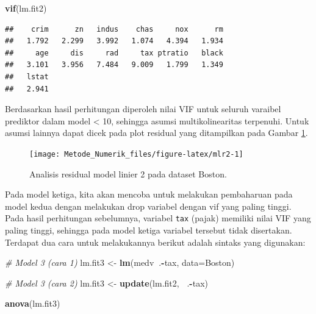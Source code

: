 \documentclass[]{book}
\newenvironment{Shaded}{\begin{snugshade}}{\end{snugshade}}
\newcommand{\CommentTok}[1]{\textcolor[rgb]{0.56,0.35,0.01}{\textit{#1}}}
\newcommand{\DataTypeTok}[1]{\textcolor[rgb]{0.13,0.29,0.53}{#1}}
\newcommand{\KeywordTok}[1]{\textcolor[rgb]{0.13,0.29,0.53}{\textbf{#1}}}
\newcommand{\NormalTok}[1]{#1}
\newcommand{\OperatorTok}[1]{\textcolor[rgb]{0.81,0.36,0.00}{\textbf{#1}}}
\newcommand{\StringTok}[1]{\textcolor[rgb]{0.31,0.60,0.02}{#1}}
\theoremstyle{definition}
\theoremstyle{definition}
\theoremstyle{definition}
\theoremstyle{remark}
\begin{document}
\begin{Shaded}
\begin{Highlighting}[]
\KeywordTok{vif}\NormalTok{(lm.fit2)}
\end{Highlighting}
\end{Shaded}

\begin{verbatim}
##    crim      zn   indus    chas     nox      rm 
##   1.792   2.299   3.992   1.074   4.394   1.934 
##     age     dis     rad     tax ptratio   black 
##   3.101   3.956   7.484   9.009   1.799   1.349 
##   lstat 
##   2.941
\end{verbatim}

Berdasarkan hasil perhitungan diperoleh nilai VIF untuk seluruh varaibel prediktor dalam model \textless{} 10, sehingga asumsi multikolinearitas terpenuhi. Untuk asumsi lainnya dapat dicek pada plot residual yang ditampilkan pada Gambar \ref{fig:mlr2}.

\begin{figure}

{\centering \texttt{[image: Metode\_Numerik\_files/figure-latex/mlr2-1]} 

}

\caption{Analisis residual model linier 2 pada dataset Boston.}\label{fig:mlr2}
\end{figure}

Pada model ketiga, kita akan mencoba untuk melakukan pembaharuan pada model kedua dengan melakukan drop variabel dengan vif yang paling tinggi. Pada hasil perhitungan sebelumnya, variabel \texttt{tax} (pajak) memiliki nilai VIF yang paling tinggi, sehingga pada model ketiga variabel tersebut tidak disertakan. Terdapat dua cara untuk melakukannya berikut adalah sintaks yang digunakan:

\begin{Shaded}
\begin{Highlighting}[]
\CommentTok{# Model 3 (cara 1)}
\NormalTok{lm.fit3 <-}\StringTok{ }\KeywordTok{lm}\NormalTok{(medv}\OperatorTok{~}\NormalTok{.}\OperatorTok{-}\NormalTok{tax, }\DataTypeTok{data=}\NormalTok{Boston)}

\CommentTok{# Model 3 (cara 2)}
\NormalTok{lm.fit3 <-}\StringTok{ }\KeywordTok{update}\NormalTok{(lm.fit2, }\OperatorTok{~}\NormalTok{.}\OperatorTok{-}\NormalTok{tax)}

\KeywordTok{anova}\NormalTok{(lm.fit3)}
\end{Highlighting}
\end{Shaded}
\end{document}
